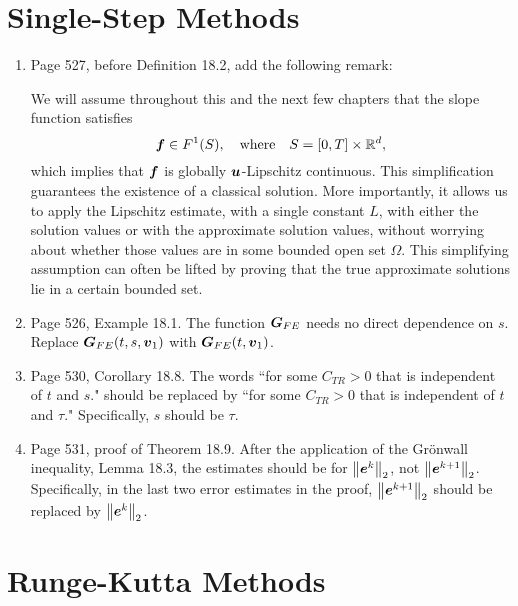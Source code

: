 \documentclass{book}
\begin{document}
\chapter{Single-Step Methods}

	\begin{enumerate}
	\item
Page 527, before Definition 18.2, add the following remark:

	\medskip
	
	\begin{rem}
We will assume throughout this and the next few chapters that the slope function satisfies 
	\[
\boldsymbol{f}\in F^1(S), \quad  \mbox{where} \quad  S = [0,T]\times \mathbb R^d,
	\]
which implies that $\boldsymbol{f}$ is globally $\boldsymbol{u}$-Lipschitz continuous. This simplification guarantees the existence of a classical solution. More importantly, it allows us to apply the Lipschitz estimate, with a single constant $L$, with either the solution values or with the approximate solution values, without worrying about whether those values are in some bounded open set $\Omega$. This simplifying assumption can often be lifted by proving that the true approximate solutions lie in a certain bounded set.
	\end{rem}
	
	\item
Page 526, Example 18.1. The function $\boldsymbol{G}_{FE}$ needs no direct dependence on $s$. Replace $\boldsymbol{G}_{FE}(t,s,\boldsymbol{v}_1)$ with $\boldsymbol{G}_{FE}(t,\boldsymbol{v}_1)$.

	\item
Page 530, Corollary 18.8. The words ``for some $C_{TR}>0$ that is independent of $t$ and $s$." should be replaced by ``for some $C_{TR}>0$ that is independent of $t$ and $\tau$." Specifically, $s$ should be $\tau$.

	\item
Page 531, proof of Theorem 18.9. After the application of the Gr\"{o}nwall inequality, Lemma 18.3, the estimates should be for $\left\| \boldsymbol{e}^k \right\|_2$, not $\left\| \boldsymbol{e}^{k+1} \right\|_2$. Specifically, in the last two error estimates in the proof, $\left\| \boldsymbol{e}^{k+1} \right\|_2$ should be replaced by $\left\| \boldsymbol{e}^k \right\|_2$. 
  
	\end{enumerate}
	
\chapter{Runge-Kutta Methods}
\end{document}
